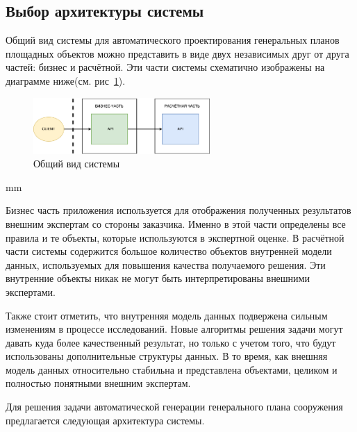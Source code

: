 \subsection*{\large{Выбор архитектуры системы}}

Общий вид системы для автоматического проектирования генеральных планов площадных объектов можно представить в виде
двух независимых друг от друга частей: бизнес и расчётной.
Эти части системы схематично изображены на диаграмме ниже(см. рис\ \ref{pic:architecture__system-diagram}).

\begin{figure}[H]
	\hspace*{-2.5 cm}\includegraphics[width=0.6\textwidth, left]{architecture/pictures/system}
	\caption{Общий вид системы}
	\label{pic:architecture__system-diagram}
\end{figure}
 mm

Бизнес часть приложения используется для отображения полученных результатов внешним экспертам со стороны заказчика.
Именно в этой части определены все правила и те объекты, которые используются в экспертной оценке.
В расчётной части системы содержится большое количество объектов внутренней модели данных, используемых для повышения
качества получаемого решения. Эти внутренние объекты никак не могут быть интерпретированы внешними экспертами.

Также стоит отметить, что внутренняя модель данных подвержена сильным изменениям в процессе исследований.
Новые алгоритмы решения задачи могут давать куда более качественный результат, но только с учетом того, что
будут использованы дополнительные структуры данных. В то время, как внешняя модель данных относительно стабильна
и представлена объектами, целиком и полностью понятными внешним экспертам.














Для решения задачи автоматической генерации генерального плана сооружения предлагается следующая архитектура системы.


